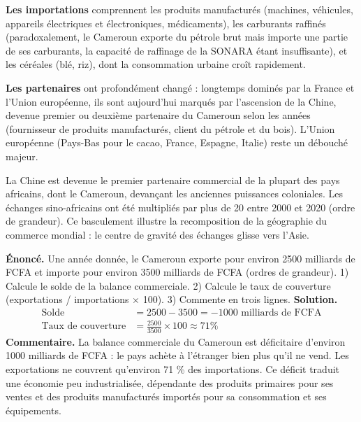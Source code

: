 \documentclass[11pt]{article}
\newcommand{\cle}[1]{{\popxbold\color{popdark}#1}}
\begin{document}
\textbf{Les importations} comprennent les produits manufacturés (machines, véhicules, appareils électriques et électroniques, médicaments), les carburants raffinés (paradoxalement, le Cameroun exporte du pétrole brut mais importe une partie de ses carburants, la capacité de raffinage de la SONARA étant insuffisante), et les céréales (blé, riz), dont la consommation urbaine croît rapidement.

\textbf{Les partenaires} ont profondément changé : longtemps dominés par la France et l'Union européenne, ils sont aujourd'hui marqués par l'ascension de la \cle{Chine}, devenue premier ou deuxième partenaire du Cameroun selon les années (fournisseur de produits manufacturés, client du pétrole et du bois). L'Union européenne (Pays-Bas pour le cacao, France, Espagne, Italie) reste un débouché majeur.

\begin{savaistu}
La Chine est devenue le premier partenaire commercial de la plupart des pays africains, dont le Cameroun, devançant les anciennes puissances coloniales. Les échanges sino-africains ont été multipliés par plus de 20 entre 2000 et 2020 (ordre de grandeur). Ce basculement illustre la recomposition de la géographie du commerce mondial : le centre de gravité des échanges glisse vers l'Asie.
\end{savaistu}

\begin{exoresolu}
\textbf{Énoncé.} Une année donnée, le Cameroun exporte pour environ \num{2 500} milliards de FCFA et importe pour environ \num{3 500} milliards de FCFA (ordres de grandeur). 1) Calcule le solde de la balance commerciale. 2) Calcule le taux de couverture (exportations / importations $\times$ 100). 3) Commente en trois lignes.
\tcblower
\textbf{Solution.}
\begin{align*}
\text{Solde} &= 2500 - 3500 = -1000 \text{ milliards de FCFA} \\
\text{Taux de couverture} &= \frac{2500}{3500} \times 100 \approx 71 \%
\end{align*}
\textbf{Commentaire.} La balance commerciale du Cameroun est déficitaire d'environ \num{1 000} milliards de FCFA : le pays achète à l'étranger bien plus qu'il ne vend. Les exportations ne couvrent qu'environ 71 \% des importations. Ce déficit traduit une économie peu industrialisée, dépendante des produits primaires pour ses ventes et des produits manufacturés importés pour sa consommation et ses équipements.
\end{exoresolu}
\end{document}
